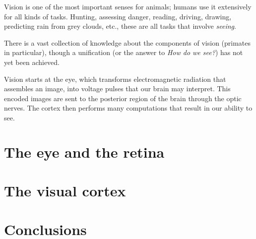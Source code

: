 Vision is one of the most important senses for animals; humans use it extensively for all kinds of tasks. Hunting, assessing danger, reading, driving, drawing, predicting rain from grey clouds, etc., these are all tasks that involve \emph{seeing}. 

There is a vast collection of knowledge about the components of vision (primates in particular), though a unification (or the answer to \emph{How do we see?}) has not yet been achieved.



Vision starts at the eye, which transforms electromagnetic radiation that assembles an image, into voltage pulses that our brain may interpret. This encoded images are sent to the posterior region of the brain through the optic nerves. The cortex then performs many computations that result in our ability to see.

\section{The eye and the retina}
\label{sec:vision:eye}


\section{The visual cortex}
\label{sec:vision:cortex}


\section{Conclusions}
\label{sec:vision:conclusions}


%
